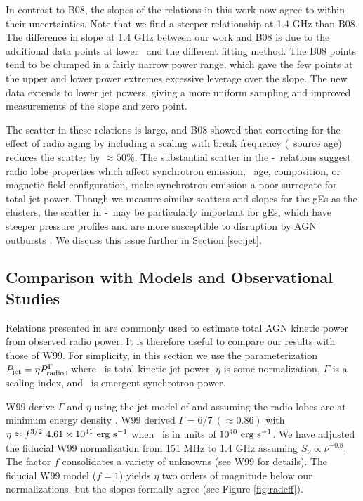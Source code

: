 \documentclass[12pt, preprint]{aastex}
\begin{document}
In contrast to B08, the slopes of the relations in this work now agree
to within their uncertainties. Note that we find a steeper
relationship at 1.4 GHz than B08. The difference in slope at 1.4 GHz
between our work and B08 is due to the additional data points at lower
\pjet\ and the different fitting method. The B08 points tend to be
clumped in a fairly narrow power range, which gave the few points at
the upper and lower power extremes excessive leverage over the
slope. The new data extends to lower jet powers, giving a more uniform
sampling and improved measurements of the slope and zero point.

The scatter in these relations is large, and B08 showed that
correcting for the effect of radio aging by including a scaling with
break frequency (\ie\ source age) reduces the scatter by $\approx
50\%$. The substantial scatter in the \pjet-\prad\ relations suggest
radio lobe properties which affect synchrotron emission, \eg\ age,
composition, or magnetic field configuration, make synchrotron
emission a poor surrogate for total jet power. Though we measure
similar scatters and slopes for the gEs as the clusters, the scatter
in \pjet-\prad\ may be particularly important for gEs, which have
steeper pressure profiles and are more susceptible to disruption by
AGN outbursts \citep{2006MNRAS.372.1161W, 2008ApJ...687L..53P}. We
discuss this issue further in Section \ref{sec:jet}.

\subsection{Comparison with Models and Observational Studies}
\label{sec:models}

Relations presented in \citet[][hereafter W99]{w99} are commonly used
to estimate total AGN kinetic power from observed radio power. It is
therefore useful to compare our results with those of W99. For
simplicity, in this section we use the parameterization $P_{\rm{jet}} = \eta
P_{\rm{radio}}^{\Gamma}$, where \pjet\ is total kinetic jet power, $\eta$ is
some normalization, $\Gamma$ is a scaling index, and \prad\ is
emergent synchrotron power.

W99 derive $\Gamma$ and $\eta$ using the jet model of
\citet{1991MNRAS.250..581F} and assuming the radio lobes are at
minimum energy density \citep[see][for
  details]{1980ARA&A..18..165M}. W99 derived $\Gamma = 6/7 ~(\approx
0.86)$ with $\eta \approx f^{3/2}~4.61 \times 10^{41} ~\rm{\mbox{\ensuremath{\rm{erg}}}~\ensuremath{\rm{\mbox{\ensuremath{\rm{s}}}^{-1}}}}$ when
\prad\ is in units of $10^{40} ~\rm{\mbox{\ensuremath{\rm{erg}}}~\ensuremath{\rm{\mbox{\ensuremath{\rm{s}}}^{-1}}}}$. We have adjusted the fiducial
W99 normalization from 151 MHz to 1.4 GHz assuming $S_{\nu} \propto
\nu^{-0.8}$. The factor $f$ consolidates a variety of unknowns (see
W99 for details). The fiducial W99 model ($f=1$) yields $\eta$ two
orders of magnitude below our normalizations, but the slopes formally
agree (see Figure \ref{fig:radeff}).
\end{document}

